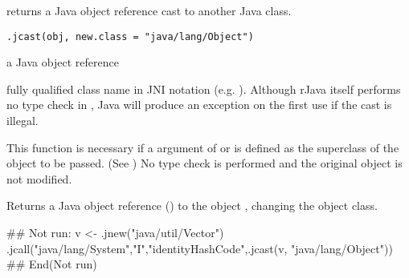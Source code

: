 \begin{Description}\relax
{} returns a Java object reference cast to another Java class.
\end{Description}
\begin{Usage}
\begin{verbatim}
.jcast(obj, new.class = "java/lang/Object")
\end{verbatim}
\end{Usage}
\begin{Arguments}
\begin{ldescription}
\item[\code{obj}] a Java object reference
\item[\code{new.class}] fully qualified class name in JNI notation
(e.g. ). Although rJava itself performs no
type check in , Java will produce an exception on the
first use if the cast is illegal.
\end{ldescription}
\end{Arguments}
\begin{Details}\relax
This function is necessary if a argument of  or
 is defined as the superclass of the object to be
passed. (See ) No type check is performed and the
original object is not modified.
\end{Details}
\begin{Value}
Returns a Java object reference () to the object
, changing the object class.
\end{Value}
\begin{SeeAlso}\relax
{}
\end{SeeAlso}
\begin{Examples}
\begin{ExampleCode}
## Not run: 
v <- .jnew("java/util/Vector")
.jcall("java/lang/System","I","identityHashCode",.jcast(v, "java/lang/Object"))
## End(Not run)
\end{ExampleCode}
\end{Examples}

